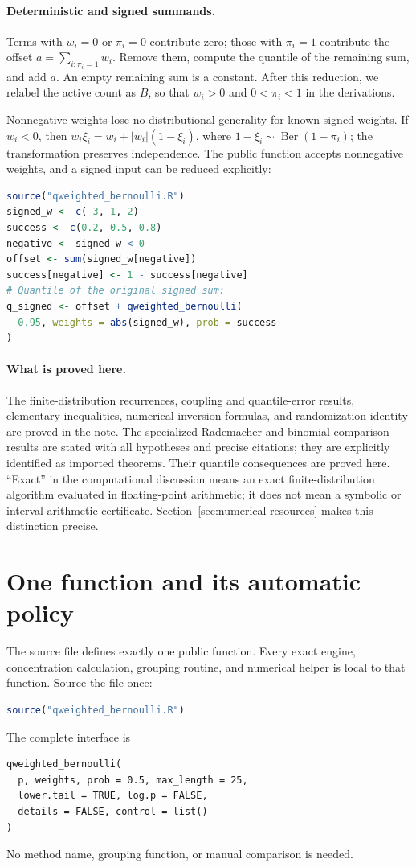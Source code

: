 \documentclass[11pt,letterpaper]{article}
\numberwithin{equation}{section}
\theoremstyle{definition}
\theoremstyle{remark}
\begin{document}
\paragraph{Deterministic and signed summands.}
Terms with $w_i=0$ or $\pi_i=0$ contribute zero; those with $\pi_i=1$
contribute the offset $a=\sum_{i:\pi_i=1}w_i$. Remove them, compute the
quantile of the remaining sum, and add $a$. An empty remaining sum is a
constant. After this reduction, we relabel the active count as $B$, so that
$w_i>0$ and $0<\pi_i<1$ in the derivations.

Nonnegative weights lose no distributional generality for known signed
weights. If $w_i<0$, then
$w_i\xi_i=w_i+|w_i|(1-\xi_i)$, where
$1-\xi_i\sim\operatorname{Ber}(1-\pi_i)$; the transformation preserves
independence. The public function accepts nonnegative weights, and a signed
input can be reduced explicitly:
\begin{lstlisting}[language=R]
source("qweighted_bernoulli.R")
signed_w <- c(-3, 1, 2)
success <- c(0.2, 0.5, 0.8)
negative <- signed_w < 0
offset <- sum(signed_w[negative])
success[negative] <- 1 - success[negative]
# Quantile of the original signed sum:
q_signed <- offset + qweighted_bernoulli(
  0.95, weights = abs(signed_w), prob = success
)
\end{lstlisting}

\paragraph{What is proved here.}
The finite-distribution recurrences, coupling and quantile-error results,
elementary inequalities, numerical inversion formulas, and randomization
identity are proved in the note. The specialized Rademacher and binomial
comparison results are stated with all hypotheses and precise citations;
they are explicitly identified as imported theorems. Their quantile
consequences are proved here. ``Exact'' in the computational discussion
means an exact finite-distribution algorithm evaluated in floating-point
arithmetic; it does not mean a symbolic or interval-arithmetic certificate.
Section~\ref{sec:numerical-resources} makes this distinction precise.

\section{One function and its automatic policy}
\label{sec:usage}

The source file defines exactly one public function. Every exact engine,
concentration calculation, grouping routine, and numerical helper is local
to that function. Source the file once:
\begin{lstlisting}[language=R]
source("qweighted_bernoulli.R")
\end{lstlisting}
The complete interface is
\begin{lstlisting}[style=output]
qweighted_bernoulli(
  p, weights, prob = 0.5, max_length = 25,
  lower.tail = TRUE, log.p = FALSE,
  details = FALSE, control = list()
)
\end{lstlisting}
No method name, grouping function, or manual comparison is needed.
\end{document}

